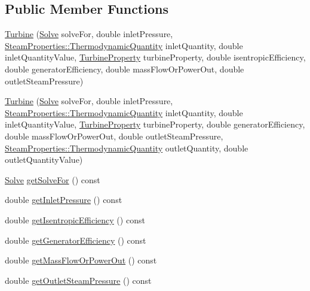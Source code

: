 \subsection*{Public Member Functions}
\begin{DoxyCompactItemize}
\item 
\hyperlink{class_turbine_a3c3c871b9fe57d48dd06b109794381dc}{Turbine} (\hyperlink{class_turbine_a9fd7beba6c6f071e228fbe3e07969d2b}{Solve} solve\+For, double inlet\+Pressure, \hyperlink{class_steam_properties_ae0294bedf7d178c2d8fb6aed0f62fbff}{Steam\+Properties\+::\+Thermodynamic\+Quantity} inlet\+Quantity, double inlet\+Quantity\+Value, \hyperlink{class_turbine_a5db4f65cf2539e3837684d53221ade12}{Turbine\+Property} turbine\+Property, double isentropic\+Efficiency, double generator\+Efficiency, double mass\+Flow\+Or\+Power\+Out, double outlet\+Steam\+Pressure)
\item 
\hyperlink{class_turbine_a1ec182906c075407882de542954d9030}{Turbine} (\hyperlink{class_turbine_a9fd7beba6c6f071e228fbe3e07969d2b}{Solve} solve\+For, double inlet\+Pressure, \hyperlink{class_steam_properties_ae0294bedf7d178c2d8fb6aed0f62fbff}{Steam\+Properties\+::\+Thermodynamic\+Quantity} inlet\+Quantity, double inlet\+Quantity\+Value, \hyperlink{class_turbine_a5db4f65cf2539e3837684d53221ade12}{Turbine\+Property} turbine\+Property, double generator\+Efficiency, double mass\+Flow\+Or\+Power\+Out, double outlet\+Steam\+Pressure, \hyperlink{class_steam_properties_ae0294bedf7d178c2d8fb6aed0f62fbff}{Steam\+Properties\+::\+Thermodynamic\+Quantity} outlet\+Quantity, double outlet\+Quantity\+Value)
\item 
\hyperlink{class_turbine_a9fd7beba6c6f071e228fbe3e07969d2b}{Solve} \hyperlink{class_turbine_a58c73057a4b890eab2af2b42c82484e6}{get\+Solve\+For} () const
\item 
double \hyperlink{class_turbine_a148ad3877851f1c3931d8a6771d750c5}{get\+Inlet\+Pressure} () const
\item 
double \hyperlink{class_turbine_a5d907859de4acc153a32bd443238b445}{get\+Isentropic\+Efficiency} () const
\item 
double \hyperlink{class_turbine_a92266fd994310d1842ba37c05bc40bf8}{get\+Generator\+Efficiency} () const
\item 
double \hyperlink{class_turbine_a820a090d264b96ee84f717555545c287}{get\+Mass\+Flow\+Or\+Power\+Out} () const
\item 
double \hyperlink{class_turbine_a1589b2364a553db7aaa875bb543d171d}{get\+Outlet\+Steam\+Pressure} () const
\item 

\end{DoxyCompactItemize}
